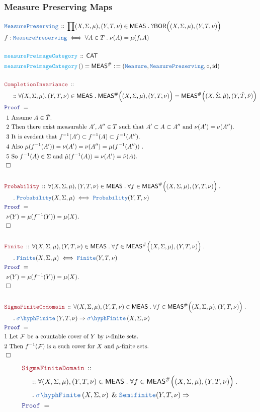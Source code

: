 \documentclass[12pt]{scrartcl}
\newcommand{\TYPE}[1]{\textcolor{NavyBlue}{\mathtt{#1}}}
\newcommand{\FUNC}[1]{\textcolor{Cerulean}{\mathtt{#1}}}
\newcommand{\LOGIC}[1]{\textcolor{Blue}{\mathtt{#1}}}
\newcommand{\THM}[1]{\textcolor{Maroon}{\mathtt{#1}}}
\renewcommand{\.}{\; . \;}
\newcommand{\de}{: \kern 0.1pc =}
\newcommand{\Act}[1]{\left( #1 \right)}
\newcommand{\Theorem}[2]{& \THM{#1} \, :: \, #2 \\ & \Proof = \\ }
\newcommand{\DeclareType}[2]{& \TYPE{#1} \, :: \, #2 \\}
\newcommand{\DefineType}[3]{& #1 : \TYPE{#2} \iff #3 \\}
\newcommand{\DeclareFunc}[2]{& \FUNC{#1} \, :: \, #2 \\}
\newcommand{\DefineNamedFunc}[4]{&  \FUNC{#1}\Act{#2} = #3 \de #4 \\}
\newcommand{\NewLine}{\\ & \kern 1pc}
\newcommand{\Page}[1]{ \begin{align*} #1 \end{align*}   }
\renewcommand{\And}{\; \& \;}
\newcommand{\Imply}{\Rightarrow}
\DeclareMathOperator*{\id}{id}
\newcommand{\QED}{\; \square}
\newcommand{\EndProof}{& \QED \\}
\newcommand{\Proof}{\LOGIC{Proof} \; }
\newcommand{\Explain}[1]{& \text{#1.} \\}
\newcommand{\CAT}{\mathsf{CAT}}
\newcommand{\BOR}{\mathsf{BOR}}
\newcommand{\SF}[1]{\TYPE{\sigma \hyph  Finite}\left( #1 \right) }
\newcommand{\F}{\mathcal{F}}
\newcommand{\MEAS}{\mathsf{MEAS}}
\begin{document}
\subsubsection{Measure Preserving Maps}
\Page{
	\DeclareType{MeasurePreserving}
	{
		\prod (X,\Sigma,\mu),(Y,T,\nu) \in \MEAS \. ?\BOR\Big((X,\Sigma,\mu),(Y,T,\nu)\Big)
	}
	\DefineType{f}{MeasurePreserving}
	{
		\forall A \in T \.  \nu(A) = \mu( f_*A)
	}
	\\
	\DeclareFunc{measurePreimageCategory}
	{
		\CAT
	}
	\DefineNamedFunc{measurePreimageCategory}
	{}
	{\MEAS^\#}
	{
		(\TYPE{Measure},\TYPE{MeasurePreserving},\circ,\id)
	}
	\\
	\Theorem{CompletionInvariance}
	{
		\NewLine ::		
		\forall (X,\Sigma,\mu),(Y,T,\nu) \in \MEAS \. 
		\MEAS^\#\Big((X,\Sigma,\mu),(Y,T,\nu)\Big) =
		\MEAS^\#\Big((X,\hat \Sigma,\hat \mu),(Y,\hat T,\hat \nu)\Big)  
	}
	\Explain{ 1 Assume $A \in \hat T$}
	\Explain{ 2 Then there exist measurable $A',A'' \in T$ such that 
		$A' \subset A \subset A''$ and $\nu(A') = \nu(A'')$}
	\Explain{ 3 It is evedent that $f^{-1}(A') \subset f^{-1}(A) \subset f^{-1}(A'')$}
	\Explain{ 4 Also $\mu(f^{-1}(A')) = \nu(A') = \nu(A'') = \mu(f^{-1}(A''))$   }
	\Explain{ 5 So $f^{-1}(A) \in \Sigma$ and $\hat\mu(f^{-1}(A)) = \nu(A') = \hat \nu(A)$}
	\EndProof
	\\
	\Theorem{Probability}
	{
		\forall (X,\Sigma,\mu),(Y,T,\nu) \in \MEAS \. 
		\forall f \in \MEAS^\#\Big((X,\Sigma,\mu),(Y,T,\nu)\Big) \. \NewLine \.
		\TYPE{Probability}(X,\Sigma,\mu) 
		\iff
		\TYPE{Probability}(Y,T,\nu) 	
	}
	\Explain{ $\nu(Y) = \mu(f^{-1}(Y)) = \mu(X)$}
	\EndProof
	\\	
	\Theorem{Finite}
	{
		\forall (X,\Sigma,\mu),(Y,T,\nu) \in \MEAS \. 
		\forall f \in \MEAS^\#\Big((X,\Sigma,\mu),(Y,T,\nu)\Big) \. \NewLine \.
		\TYPE{Finite}(X,\Sigma,\mu) 
		\iff
		\TYPE{Finite}(Y,T,\nu) 	
	}
	\Explain{ $\nu(Y) = \mu(f^{-1}(Y)) = \mu(X)$}
	\EndProof
	\\
	\Theorem{SigmaFiniteCodomain}
	{
		\forall (X,\Sigma,\mu),(Y,T,\nu) \in \MEAS \. 
		\forall f \in \MEAS^\#\Big((X,\Sigma,\mu),(Y,T,\nu)\Big) \. \NewLine \.
		\SF{Y,T,\nu} 
		\Imply
		\SF{X,\Sigma,\nu} 
	}
	\Explain{1 Let $\F$ be a countable cover of $Y$ by $\nu$-finite sets}
	\Explain{2 Then $f^{-1}(\F)$ is a such cover for $X$ and $\mu$-finite sets}
	\EndProof
}\Page{
	\Theorem{SigmaFiniteDomain}
	{
		\NewLine ::	
		\forall (X,\Sigma,\mu),(Y,T,\nu) \in \MEAS \. 
		\forall f \in \MEAS^\#\Big((X,\Sigma,\mu),(Y,T,\nu)\Big) \. \NewLine \.
		\SF{X,\Sigma,\nu} \And  \TYPE{Semifinite}(Y,T,\nu)
		\Imply
}}
\end{document}

